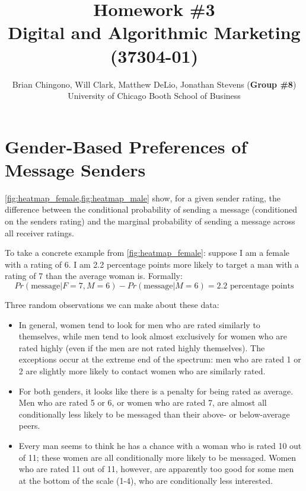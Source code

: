 



\title{Homework \#3\\
Digital and Algorithmic Marketing (37304-01)}
\author{
Brian Chingono, Will Clark, Matthew DeLio, Jonathan Stevens (\textbf{Group \#8})\\
University of Chicago Booth School of Business}

\maketitle

\section{Gender-Based Preferences of Message Senders}

\vref{fig:heatmap_female,fig:heatmap_male} show, for a given sender rating, the difference between the conditional probability of sending a message (conditioned on the senders rating) and the marginal probability of sending a message across all receiver ratings. 

To take a concrete example from \cref{fig:heatmap_female}: suppose I am a female with a rating of 6. I am 2.2 percentage points more likely to target a man with a rating of 7 than the average woman is. Formally:
\[ Pr(\text{message}|F=7,M=6) - Pr(\text{message}|M=6) = 2.2 \text{ percentage points}\]


Three random observations we can make about these data:
\begin{itemize}
\item In general, women tend to look for men who are rated similarly to themselves, while men tend to look almost exclusively for women who are rated highly (even if the men are not rated highly themselves). The exceptions occur at the extreme end of the spectrum: men who are rated 1 or 2 are slightly more likely to contact women who are similarly rated.
\item For both genders, it looks like there is a penalty for being rated as average. Men who are rated 5 or 6, or women who are rated 7, are almost all conditionally less likely to be messaged than their above- or below-average peers.
\item Every man seems to think he has a chance with a woman who is rated 10 out of 11; these women are all conditionally more likely to be messaged. Women who are rated 11 out of 11, however, are apparently too good for some men at the bottom of the scale (1-4), who are conditionally less interested.
\end{itemize}

